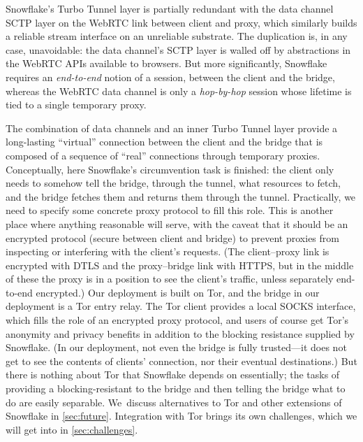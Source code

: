 \documentclass[letterpaper,twocolumn]{article}
\begin{document}
Snowflake's Turbo Tunnel layer
is partially redundant with the data channel SCTP layer
on the WebRTC link between client and proxy,
which similarly builds a reliable stream interface
on an unreliable substrate.
The duplication is, in any case, unavoidable:
the data channel's SCTP layer is walled off by abstractions
in the WebRTC APIs available to browsers.
But more significantly, Snowflake requires an
\emph{end-to-end} notion of a session,
between the client and the bridge,
whereas the WebRTC data channel is only a
\emph{hop-by-hop} session
whose lifetime is tied to a single temporary proxy.

The combination of data channels and an inner Turbo Tunnel layer
provide a long-lasting ``virtual'' connection between the client and the bridge
that is composed of a sequence of ``real'' connections through temporary proxies.
Conceptually, here Snowflake's circumvention task is finished:
the client only needs to somehow tell the bridge, through the tunnel,
what resources to fetch, and the bridge fetches them and returns them through the tunnel.
Practically, we need to specify some concrete proxy protocol to fill this role.
This is another place where anything reasonable will serve,
with the caveat that it should be an encrypted protocol
(secure between client and bridge) to prevent proxies
from inspecting or interfering with the client's requests.
(The client--proxy link is encrypted with DTLS
and the proxy--bridge link with HTTPS,
but in the middle of these the proxy is in a position to see
the client's traffic, unless separately end-to-end encrypted.)
Our deployment is built on Tor,
and the bridge in our deployment is a Tor entry relay.
The Tor client provides a local SOCKS interface,
which fills the role of an encrypted proxy protocol,
and users of course get Tor's anonymity and privacy benefits
in addition to the blocking resistance supplied by Snowflake.
(In our deployment, not even the bridge is fully trusted---it
does not get to see the contents of clients' connection,
nor their eventual destinations.)
But there is nothing about Tor that Snowflake depends on essentially;
the tasks of providing a blocking-resistant to the bridge
and then telling the bridge what to do are easily separable.
We~discuss alternatives to Tor
and other extensions of Snowflake in \autoref{sec:future}.
Integration with Tor brings its own challenges,
which we will get into in \autoref{sec:challenges}.
\end{document}
